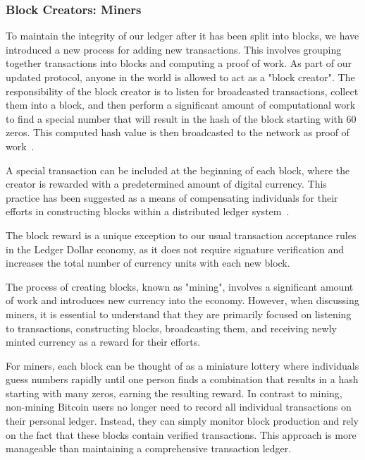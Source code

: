 \subsubsection{Block Creators: Miners}
To maintain the integrity of our ledger after it has been split into blocks, we have introduced a new process for adding new transactions. This involves grouping together transactions into blocks and computing a proof of work. As part of our updated protocol, anyone in the world is allowed to act as a "block creator". The responsibility of the block creator is to listen for broadcasted transactions, collect them into a block, and then perform a significant amount of computational work to find a special number that will result in the hash of the block starting with 60 zeros. This computed hash value is then broadcasted to the network as proof of work~\cite{wood2014ethereum}.

A special transaction can be included at the beginning of each block, where the creator is rewarded with a predetermined amount of digital currency. This practice has been suggested as a means of compensating individuals for their efforts in constructing blocks within a distributed ledger system~\cite{ding2020incentive}.

%

The block reward is a unique exception to our usual transaction acceptance rules in the Ledger Dollar economy, as it does not require signature verification and increases the total number of currency units with each new block.

The process of creating blocks, known as "mining", involves a significant amount of work and introduces new currency into the economy. However, when discussing miners, it is essential to understand that they are primarily focused on listening to transactions, constructing blocks,
broadcasting them, and receiving newly minted currency as a reward for their efforts.

For miners, each block can be thought of as a miniature lottery where individuals guess numbers rapidly until one person finds a combination that results in a hash starting with many zeros, earning the resulting reward. In contrast to mining, non-mining Bitcoin users no longer need to record all individual transactions on their personal ledger. Instead, they can simply monitor block production and rely on the fact that these blocks contain verified transactions. This approach is more manageable than maintaining a comprehensive transaction ledger.

